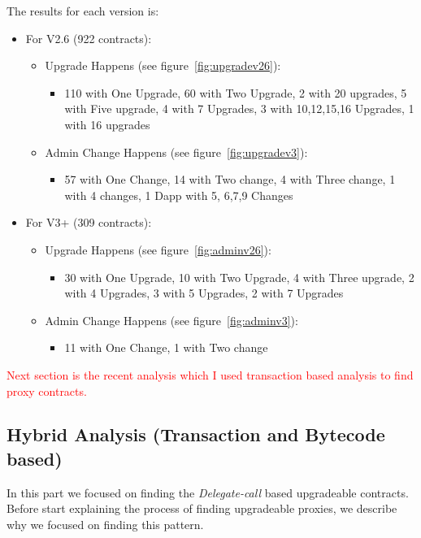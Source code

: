 The results for each version is:
\begin{itemize}
  \item For V2.6 (922 contracts):
  \begin{itemize}
    \item Upgrade Happens (see figure~\ref{fig:upgradev26}):
    \begin{itemize}
      \item 110 with One Upgrade, 60 with Two Upgrade, 2 with 20 upgrades, 5 with Five upgrade, 4 with 7 Upgrades, 3 with 10,12,15,16 Upgrades, 1 with 16 upgrades
    \end{itemize}
    \item Admin Change Happens (see figure~\ref{fig:upgradev3}):
    \begin{itemize}
      \item 57 with One Change, 14 with Two change, 4 with Three change, 1 with 4 changes, 1 Dapp with 5, 6,7,9 Changes
    \end{itemize}
  \end{itemize}
  \item For V3+ (309 contracts):
  \begin{itemize}
    \item Upgrade Happens (see figure~\ref{fig:adminv26}):
    \begin{itemize}
      \item 30 with One Upgrade, 10 with Two Upgrade, 4 with Three upgrade, 2 with 4 Upgrades, 3 with 5 Upgrades, 2 with 7 Upgrades
    \end{itemize}
    \item Admin Change Happens (see figure~\ref{fig:adminv3}):
    \begin{itemize}
      \item 11 with One Change, 1 with Two change
    \end{itemize}
  \end{itemize}
\end{itemize}


\textcolor{red}{Next section is the recent analysis which I used transaction based analysis to find proxy contracts.}



\subsection{Hybrid Analysis (Transaction and Bytecode based)}

In this part we focused on finding the \textit{Delegate-call} based upgradeable contracts. Before start explaining the process of finding upgradeable proxies, we describe why we focused on finding this pattern. 

